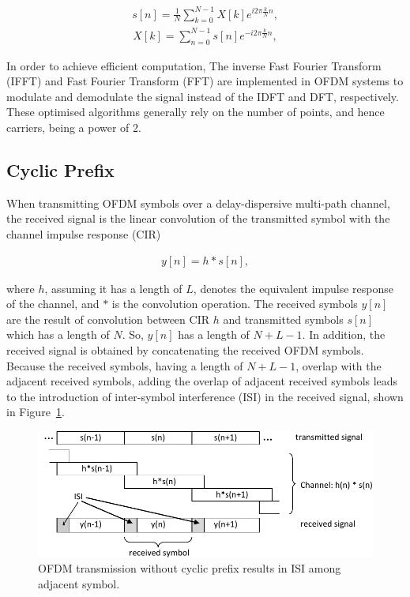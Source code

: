 \begin{eqnarray}
\label{equ:sampledOFDMsignal}
s[n] = \frac{1}{N}\sum_{k=0}^{N-1} X[k] e^{i2\pi\frac{k}{N}n},
\end{eqnarray}
\begin{eqnarray}
\label{equ:sampledOFDMsignal}
X[k] = \sum_{n=0}^{N-1} s[n] e^{-i2\pi\frac{k}{N}n},
\end{eqnarray}

In order to achieve efficient computation, The inverse Fast Fourier Transform (IFFT) and Fast Fourier Transform (FFT) are implemented in OFDM systems to modulate and demodulate the signal instead of the IDFT and DFT, respectively. These optimised algorithms generally rely on the number of points, and hence carriers, being a power of 2.

\subsection{Cyclic Prefix}

When transmitting OFDM symbols over a delay-dispersive multi-path channel, the received signal is the linear convolution of the transmitted symbol with the channel impulse response (CIR)

\begin{eqnarray}
\label{equ:sampledOFDMsignal}
y[n] = h*s[n],
\end{eqnarray}

where $h$, assuming it has a length of $L$, denotes the equivalent impulse response of the channel, and $*$ is the convolution operation.
The received symbols $y[n]$ are the result of convolution between CIR $h$ and transmitted symbols $s[n]$ which has a length of $N$.
So, $y[n]$ has a length of $N+L-1$.
In addition, the received signal is obtained by concatenating the received OFDM symbols.
Because the received symbols, having a length of $N+L-1$, overlap with the adjacent received symbols, adding the overlap of adjacent received symbols leads to the introduction of inter-symbol interference (ISI) in the received signal, shown in Figure~\ref{fig:CIR-noCP}.


\begin{figure}
	\centerline{\includegraphics [width=0.8\columnwidth] {Figures/CIR_noCP.pdf} }
	\caption{OFDM transmission without cyclic prefix results in ISI among adjacent symbol.}
	\label{fig:CIR-noCP}
\end{figure}


